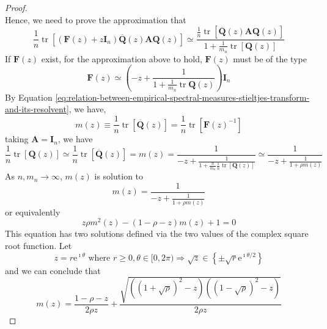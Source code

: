 \begin{proof}
\begin{equation*}
    \end{equation*}
    Hence, we need to prove the approximation that
    \begin{equation*}
        \frac{1}{n}\operatorname{tr}\left[\left(\mathbf{F}(z)+z\mathbf{I}_{n}\right)\overline{\mathbf{Q}}(z)\mathbf{A}\mathbf{Q}(z)\right]\simeq\frac{\frac{1}{n}\operatorname{tr}\left[\overline{\mathbf{Q}}(z)\mathbf{A}\mathbf{Q}(z)\right]}{1+\frac{1}{m_{n}}\operatorname{tr}\left[\mathbf{Q}(z)\right]}
    \end{equation*}
    If $\mathbf{F}(z)$ exist, for the approximation above to hold, $\mathbf{F}(z)$ must be of the type
    \begin{equation*}
        \mathbf{F}(z)\simeq\left(-z+\frac{1}{1+\frac{1}{m_{n}}\operatorname{tr}\mathbf{Q}(z)}\right)\mathbf{I}_{n}
    \end{equation*}
    By Equation \ref{eq:relation-between-empirical-spectral-measures-stieltjes-transform-and-its-resolvent}, we have,
    \begin{equation*}
        m(z)\equiv\frac{1}{n}\operatorname{tr}\left[\overline{\mathbf{Q}}(z)\right]=\frac{1}{n}\operatorname{tr}\left[\mathbf{F}(z)^{-1}\right]
    \end{equation*}
    taking $\mathbf{A}=\mathbf{I}_{n}$, we have
    \begin{equation*}
        \frac{1}{n}\operatorname{tr}\left[\mathbf{Q}(z)\right]\simeq\frac{1}{n}\operatorname{tr}\left[\overline{\mathbf{Q}}(z)\right]=m(z)=\frac{1}{-z+\frac{1}{1+\frac{n}{m_{n}}\frac{1}{n}\operatorname{tr}\left[\mathbf{Q}(z)\right]}}\simeq\frac{1}{-z+\frac{1}{1+\rho m(z)}}
    \end{equation*}
    As $n,m_{n}\rightarrow\infty$, $m(z)$ is solution to
    \begin{equation*}
        m(z)=\frac{1}{-z+\frac{1}{1+\rho m(z)}}
    \end{equation*}
    or equivalently
    \begin{equation*}
        z\rho m^{2}(z)-(1-\rho-z)m(z)+1=0
    \end{equation*}
    This equation has two solutions defined via the two values of the complex square root function. Let
    \begin{equation*}
        z=r\mathrm{e}^{\imath\theta}\text{ where }r\geq 0,\theta\in[0,2\pi)\Rightarrow\sqrt{z}\in\left\{\pm\sqrt{r}\mathrm{e}^{\imath\theta/2}\right\}
    \end{equation*}
    and we can conclude that
    \begin{equation*}
        m(z)=\frac{1-\rho-z}{2\rho z}+\frac{\sqrt{\left((1+\sqrt{\rho})^{2}-z\right)\left((1-\sqrt{\rho})^{2}-z\right)}}{2\rho z}

\end{equation*}
\end{proof}
